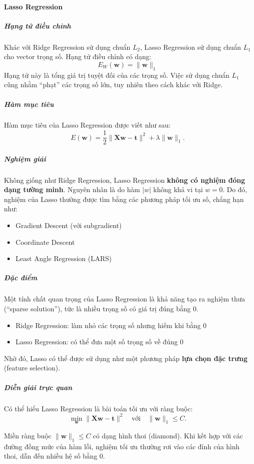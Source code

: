 \paragraph{Lasso Regression}

\subparagraph{Hạng tử điều chỉnh}
Khác với Ridge Regression sử dụng chuẩn $L_2$, Lasso Regression sử dụng chuẩn
$L_1$ cho vector trọng số. Hạng tử điều chỉnh có dạng:
\begin{equation}
  E_W(\boldsymbol{w}) = \|\boldsymbol{w}\|_1
\end{equation}
Hạng tử này là tổng giá trị tuyệt đối của các trọng số. Việc sử dụng chuẩn
$L_1$ cũng nhằm ``phạt'' các trọng số lớn, tuy nhiên theo cách khác với Ridge.

\subparagraph{Hàm mục tiêu}
Hàm mục tiêu của Lasso Regression được viết như sau:
\begin{equation}
  E(\boldsymbol{w}) = \frac{1}{2} \|\boldsymbol{X}\boldsymbol{w} -
  \boldsymbol{t}\|^2 + \lambda \|\boldsymbol{w}\|_1.
\end{equation}
\subparagraph{Nghiệm giải}
Không giống như Ridge Regression, Lasso Regression
\textbf{không có nghiệm đóng dạng tường minh}. Nguyên nhân là do hàm $|w|$
không khả vi tại $w = 0$. Do đó, nghiệm của Lasso thường được tìm bằng các
phương pháp tối ưu số, chẳng hạn như:
\begin{itemize}
  \item Gradient Descent (với subgradient)
  \item Coordinate Descent
  \item Least Angle Regression (LARS)
\end{itemize}

\subparagraph{Đặc điểm}
Một tính chất quan trọng của Lasso Regression là khả năng tạo ra nghiệm thưa
(``sparse solution''), tức là nhiều trọng số có giá trị đúng bằng 0.
\begin{itemize}
  \item Ridge Regression: làm nhỏ các trọng số nhưng hiếm khi bằng 0
  \item Lasso Regression: có thể đưa một số trọng số về đúng 0
\end{itemize}
Nhờ đó, Lasso có thể được sử dụng như một phương pháp
\textbf{lựa chọn đặc trưng} (feature selection).

\subparagraph{Diễn giải trực quan}
Có thể hiểu Lasso Regression là bài toán tối ưu với ràng buộc:
\begin{equation}
  \min_{\boldsymbol{w}} \|\boldsymbol{X}\boldsymbol{w} - \boldsymbol{t}\|^2
  \quad \text{với} \quad\|\boldsymbol{w}\|_1 \leq C.
\end{equation}

Miền ràng buộc $\|\boldsymbol{w}\|_1 \leq C$ có dạng hình thoi (diamond). Khi
kết hợp với các đường đồng mức của hàm lỗi, nghiệm tối ưu thường rơi vào các
đỉnh của hình thoi, dẫn đến nhiều hệ số bằng 0.
